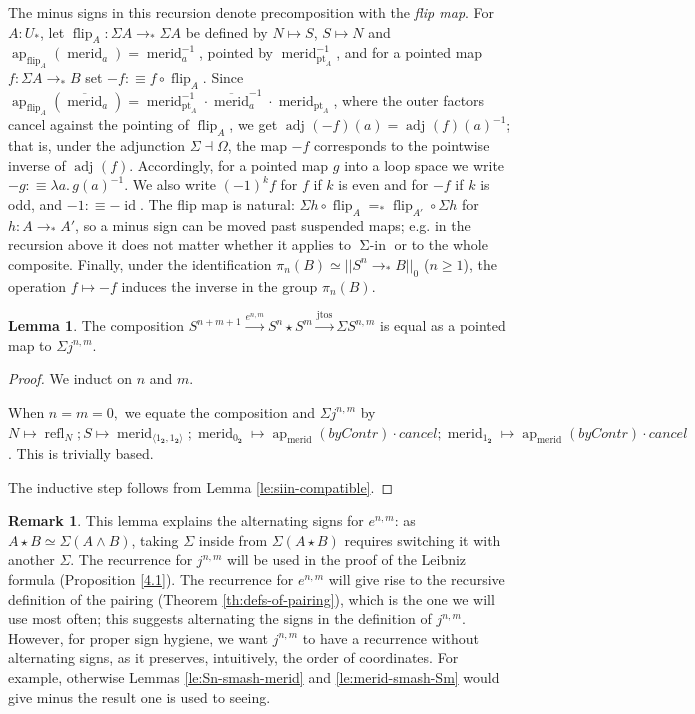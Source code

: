 \documentclass{amsart}
\theoremstyle{definition}
\newtheorem{re}[theorem]{Remark}
\newtheorem{lem}[theorem]{Lemma}
\newcommand{\id}{\operatorname{id}}
\newcommand{\ap}{\operatorname{ap}}
\newcommand{\refl}{\operatorname{refl}}
\newcommand{\merid}{\operatorname{merid}}
\newcommand{\mmerid}{\overline{{\operatorname{merid}}}}
\newcommand{\bs}[1]{\mathrm{pt}_{#1}}
\newcommand{\pto}{\to_*}
\newcommand{\adj}[1]{\operatorname{adj}^{#1}}
\newcommand{\siin}{\operatorname{\Sigma-in}}
\newcommand{\s}{\mathbf{2}}
\newcommand{\jtos}{\operatorname{jtos}}
\newcommand{\join}{\star}
\begin{document}
The minus signs in this recursion denote precomposition with the \textit{flip map}. For $A : U_*$, let $\operatorname{flip}_A : \Sigma A \pto \Sigma A$ be defined by $N \mapsto S$, $S \mapsto N$ and $\ap_{\operatorname{flip}_A}(\merid_a) = \merid_a^{-1}$, pointed by $\merid_{\bs{A}}^{-1}$, and for a pointed map $f : \Sigma A \pto B$ set $-f :\equiv f \circ \operatorname{flip}_A$. Since $\ap_{\operatorname{flip}_A}(\mmerid_a) = \merid_{\bs{A}}^{-1} \cdot \mmerid_a^{-1} \cdot \merid_{\bs{A}}$, where the outer factors cancel against the pointing of $\operatorname{flip}_A$, we get $\adj{}(-f)(a) = \adj{}(f)(a)^{-1}$; that is, under the adjunction $\Sigma \dashv \Omega$, the map $-f$ corresponds to the pointwise inverse of $\adj{}(f)$. Accordingly, for a pointed map $g$ into a loop space we write $-g :\equiv \lambda a.\, g(a)^{-1}$. We also write $(-1)^k f$ for $f$ if $k$ is even and for $-f$ if $k$ is odd, and $-1 :\equiv -\id$. The flip map is natural: $\Sigma h \circ \operatorname{flip}_A =_* \operatorname{flip}_{A'} \circ \Sigma h$ for $h : A \pto A'$, so a minus sign can be moved past suspended maps; e.g. in the recursion above it does not matter whether it applies to $\siin$ or to the whole composite. Finally, under the identification $\pi_n(B) \simeq ||S^n \pto B||_0$ ($n \geq 1$), the operation $f \mapsto -f$ induces the inverse in the group $\pi_n(B)$.



\begin{lem}\label{le:sphere-identifications}
    The composition $S^{n+m+1} \xrightarrow{e^{n,m}} S^n \join S^m \xrightarrow{\jtos}
    \Sigma S^{n,m}$ is equal as a pointed map to $\Sigma j^{n,m}$.
\end{lem}
\begin{proof}
    We induct on $n$ and $m$.

    When $n=m=0,$ we equate the composition and $\Sigma j^{n,m}$ by $N \mapsto \refl_{N}; S \mapsto \merid_{\langle 1_{\s}, 1_{\s} \rangle}; \merid_{0_{\s}} \mapsto \ap_{\merid}(byContr) \cdot cancel; \merid_{1_{\s}} \mapsto  \ap_{\merid}(byContr) \cdot cancel$. This is trivially based.

    The inductive step follows from Lemma \ref{le:siin-compatible}.
\end{proof}

\begin{re}
This lemma explains the alternating signs for $e^{n,m}$: as $A \join B \simeq \Sigma (A \wedge B)$, taking $\Sigma$ inside from $\Sigma (A \join B)$ requires switching it with another $\Sigma$.
The recurrence for $j^{n,m}$ will be used in the proof of the Leibniz formula (Proposition \ref{4.1}). The recurrence for $e^{n,m}$ will give rise to the recursive definition of the pairing (Theorem \ref{th:defs-of-pairing}), which is the one we will use most often; this suggests alternating the signs in the definition of $j^{n,m}$.
However, for proper sign hygiene, we want $j^{n,m}$ to have a recurrence without alternating signs, as it preserves, intuitively, the order of coordinates. For example, otherwise Lemmas \ref{le:Sn-smash-merid} and \ref{le:merid-smash-Sm} would give minus the result one is used to seeing.
\end{re}
\end{document}
